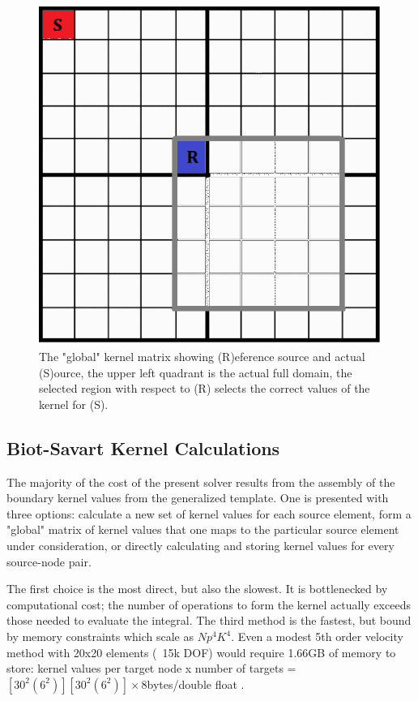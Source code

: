 \documentclass[letterpaper,12pt]{report}
\begin{document}
\begin{figure}
\centering
\includegraphics[width=5.5in]{GlobalKernel.PNG}
\caption{\label{fig:GlobalKernel}The "global" kernel matrix showing (R)eference source and actual (S)ource, the upper left quadrant is the actual full domain, the selected region with respect to (R) selects the correct values of the kernel for (S).}
\end{figure}

\subsection{Biot-Savart Kernel Calculations}
The majority of the cost of the present solver results from the assembly of the boundary kernel values from the generalized template. One is presented with three options: calculate a new set of kernel values for each source element, form a "global" matrix of kernel values that one maps to the particular source element under consideration, or directly calculating and storing kernel values for every source-node pair.

The first choice is the most direct, but also the slowest. It is bottlenecked by computational cost; the number of operations to form the kernel actually exceeds those needed to evaluate the integral. The third method is the fastest, but bound by memory constraints which scale as $Np^4 K^4$. Even a modest 5th order velocity method with 20x20 elements (~15k DOF) would require 1.66GB of memory to store: kernel values per target node x number of targets = $[30^2(6^2)][30^2(6^2)]\times$8bytes/double float .
\end{document}
